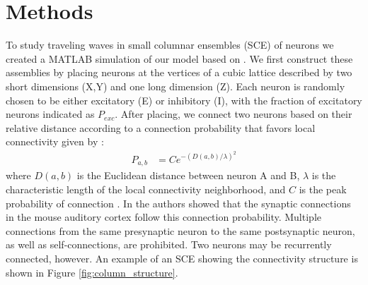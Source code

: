 \documentclass[12pt]{article}
\begin{document}
\section{Methods}
To study traveling waves in small columnar ensembles (SCE) of neurons \color{red}we created a MATLAB simulation of our model based on \parencite{izhikevich2003} \color{black}. 
We first construct these assemblies by placing neurons at the vertices of a cubic lattice described by two short \color{red} dimensions (X,Y) and one long dimension (Z)\color{black}. 
Each neuron is \color{red} randomly chosen to be \color{black} either excitatory (E) or inhibitory (I), with the fraction of excitatory neurons indicated as $P_{exc}$.
After placing, we connect two neurons based on their relative distance according to a connection probability that favors local connectivity given by \color{red} \parencite{maass2002}\color{black}: 
\begin{align}\label{eq:connectivity}
 P_{a,b} &= C e^{-(D(a,b)/\lambda)^2}
\end{align}
where $D(a,b)$ is the Euclidean distance between neuron A and B, $\lambda$ is the characteristic length of the local connectivity neighborhood, and $C$ is \color{red}the peak probability of connection \color{black}.
\color{red}In \parencite{Levy2012} the authors showed that the synaptic connections in the mouse auditory cortex follow this connection probability.
Multiple connections from the same presynaptic neuron to the same postsynaptic neuron, as well as self-connections, are prohibited.
Two neurons may be recurrently connected, however. \color{black}
An example of an SCE showing the connectivity structure is shown in Figure \ref{fig:column_structure}.
\end{document}
